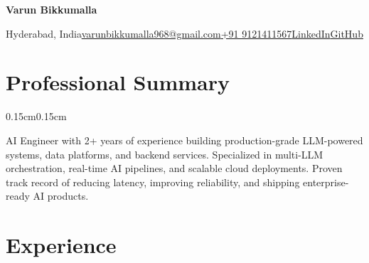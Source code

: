 \documentclass[10pt, letterpaper]{article}
\newenvironment{onecolentry}{
\begin{adjustwidth}{0.15cm}{0.15cm}
}{
\end{adjustwidth}
}
\newenvironment{header}{
\centering\linespread{1.15}\selectfont
}{}
\begin{document}
\begin{header}
{\fontsize{24pt}{24pt}\selectfont\textbf{Varun Bikkumalla}}

\vspace{6pt}

\centerline{\small Hyderabad, India\quad\textbar\quad \href{mailto:varunbikkumalla968@gmail.com}{varunbikkumalla968@gmail.com}\quad\textbar\quad \href{tel:+919121411567}{+91 9121411567}\quad\textbar\quad \href{https://www.linkedin.com/in/varunc9}{LinkedIn}\quad\textbar\quad \href{https://github.com/Varun-addh}{GitHub}}
\end{header}

\section{Professional Summary}
\begin{onecolentry}
AI Engineer with 2+ years of experience building production-grade LLM-powered systems, data platforms, and backend services. Specialized in multi-LLM orchestration, real-time AI pipelines, and scalable cloud deployments. Proven track record of reducing latency, improving reliability, and shipping enterprise-ready AI products.
\end{onecolentry}

\section{Experience}
\end{document}
